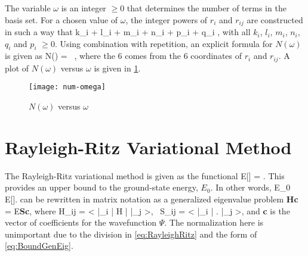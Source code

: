 \documentclass[Dissertation.tex]{subfiles}
\begin{document}
The variable $\omega$ is an integer $\geq 0$ that determines the number of 
terms in the basis set. For a chosen value of $\omega$, the integer powers of 
$r_i$ and $r_{ij}$ are constructed in such a way that \cite{VanReeth2003}
\beq
\label{eq:OmegaDef}
k_i + l_i + m_i + n_i + p_i + q_i \leq \omega,
\eeq
with all $k_i$, $l_i$, $m_i$, $n_i$, $q_i$ and $p_i$ $\geq 0$. 
Using combination with repetition, an explicit formula for $N(\omega)$ is 
given as
\beq
\label{eq:NumberTermsOmega}
N(\omega) =  \, ,
\eeq
where the 6 comes from the 6 coordinates of $r_i$ and $r_{ij}$. A plot of
$N(\omega)$ versus $\omega$ is given in \cref{fig:num-omega}.
\begin{figure}
	\centering
	\texttt{[image: num-omega]}
	\caption{$N(\omega)$ versus $\omega$}
	\label{fig:num-omega}
\end{figure}


\section{Rayleigh-Ritz Variational Method}
\label{sec:RayleighRitz}
The Rayleigh-Ritz variational method is given as the functional \cite{Bransden2003}
\beq
\label{eq:RayleighRitz}
E[\Psi] = .
\eeq
This provides an upper bound to the ground-state energy, $E_0$. In other words,
\beq
E_0 \leq E[\Psi].
\eeq
{} can be rewritten in matrix notation as a generalized eigenvalue problem
\cite{RayleighRitz}
\beq
\label{eq:BoundGenEig}
\textbf{Hc} = E\textbf{Sc},
\eeq
where
\beq
\label{eq:HijSij}
H_{ij} = \left< \bar{\phi}_i \left| H \right| \bar{\phi}_j \right>\!, \, S_{ij} = \left< \bar{\phi}_i \left| \right.\! \bar{\phi}_j \right>, 
\eeq
and \textbf{c} is the vector of coefficients for the wavefunction $\Psi$. The
normalization here is unimportant due to the division in \cref{eq:RayleighRitz}
and the form of \cref{eq:BoundGenEig}.
\end{document}
